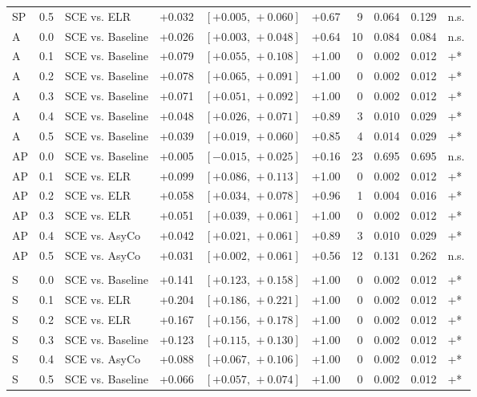 \begin{landscape}
\begin{scriptsize}
\begin{longtable}{lllrrrrrrl}
SP & 0.5 & SCE vs. ELR & +0.032 & $[+0.005,\,+0.060]$ & +0.67 & 9 & 0.064 & 0.129 & n.s. \\
A & 0.0 & SCE vs. Baseline & +0.026 & $[+0.003,\,+0.048]$ & +0.64 & 10 & 0.084 & 0.084 & n.s. \\
A & 0.1 & SCE vs. Baseline & +0.079 & $[+0.055,\,+0.108]$ & +1.00 & 0 & 0.002 & 0.012 & +* \\
A & 0.2 & SCE vs. Baseline & +0.078 & $[+0.065,\,+0.091]$ & +1.00 & 0 & 0.002 & 0.012 & +* \\
A & 0.3 & SCE vs. Baseline & +0.071 & $[+0.051,\,+0.092]$ & +1.00 & 0 & 0.002 & 0.012 & +* \\
A & 0.4 & SCE vs. Baseline & +0.048 & $[+0.026,\,+0.071]$ & +0.89 & 3 & 0.010 & 0.029 & +* \\
A & 0.5 & SCE vs. Baseline & +0.039 & $[+0.019,\,+0.060]$ & +0.85 & 4 & 0.014 & 0.029 & +* \\
AP & 0.0 & SCE vs. Baseline & +0.005 & $[-0.015,\,+0.025]$ & +0.16 & 23 & 0.695 & 0.695 & n.s. \\
AP & 0.1 & SCE vs. ELR & +0.099 & $[+0.086,\,+0.113]$ & +1.00 & 0 & 0.002 & 0.012 & +* \\
AP & 0.2 & SCE vs. ELR & +0.058 & $[+0.034,\,+0.078]$ & +0.96 & 1 & 0.004 & 0.016 & +* \\
AP & 0.3 & SCE vs. ELR & +0.051 & $[+0.039,\,+0.061]$ & +1.00 & 0 & 0.002 & 0.012 & +* \\
AP & 0.4 & SCE vs. AsyCo & +0.042 & $[+0.021,\,+0.061]$ & +0.89 & 3 & 0.010 & 0.029 & +* \\
AP & 0.5 & SCE vs. AsyCo & +0.031 & $[+0.002,\,+0.061]$ & +0.56 & 12 & 0.131 & 0.262 & n.s. \\
\addlinespace
\multicolumn{10}{l}{\textit{Macro F1}} \\
S & 0.0 & SCE vs. Baseline & +0.141 & $[+0.123,\,+0.158]$ & +1.00 & 0 & 0.002 & 0.012 & +* \\
S & 0.1 & SCE vs. ELR & +0.204 & $[+0.186,\,+0.221]$ & +1.00 & 0 & 0.002 & 0.012 & +* \\
S & 0.2 & SCE vs. ELR & +0.167 & $[+0.156,\,+0.178]$ & +1.00 & 0 & 0.002 & 0.012 & +* \\
S & 0.3 & SCE vs. Baseline & +0.123 & $[+0.115,\,+0.130]$ & +1.00 & 0 & 0.002 & 0.012 & +* \\
S & 0.4 & SCE vs. AsyCo & +0.088 & $[+0.067,\,+0.106]$ & +1.00 & 0 & 0.002 & 0.012 & +* \\
S & 0.5 & SCE vs. Baseline & +0.066 & $[+0.057,\,+0.074]$ & +1.00 & 0 & 0.002 & 0.012 & +* \\

\end{longtable}
\end{scriptsize}
\end{landscape}
